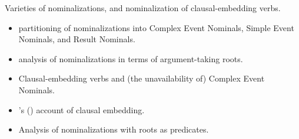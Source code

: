 \documentclass[cronos,landscape,paper=a4]{ling-handout}
\begin{document}
    Varieties of nominalizations, and nominalization of clausal-embedding verbs.

    \begin{itemize}
    \item {} partitioning of
      nominalizations into Complex Event Nominals, Simple Event Nominals, and
      Result Nominals.
      \item {} analysis of nominalizations in terms of
        argument-taking roots.
      \item Clausal-embedding verbs and (the unavailability of) Complex Event
        Nominals.
      \item \citeauthor{elliott2016}'s (\citeyear{elliott2016,elliott2017_sub})
        account of clausal embedding.
      \item Analysis of nominalizations with roots as predicates.
    \end{itemize}



\printbibliography

\end{document}
